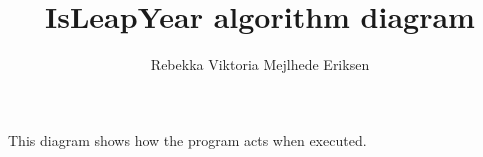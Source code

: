 \documentclass{article}
\begin{document}
\title{IsLeapYear algorithm diagram}
\author{Rebekka Viktoria Mejlhede Eriksen}
\maketitle

\newpage

This diagram shows how the program acts when executed.
\end{document}
